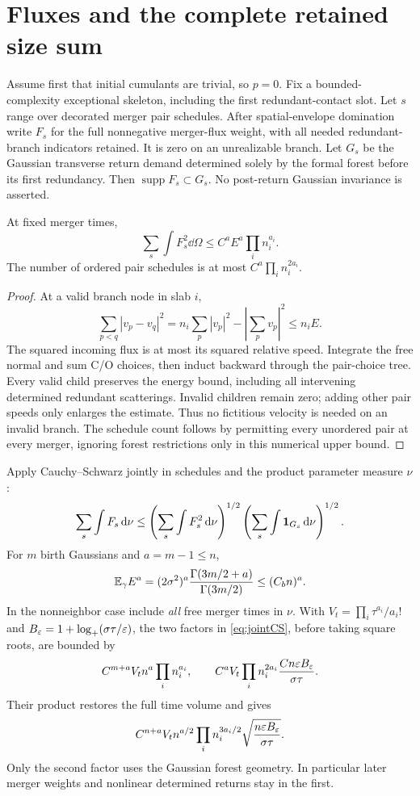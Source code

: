 \section{Fluxes and the complete retained size sum}\label{sec:summation}
Assume first that initial cumulants are trivial, so $p=0$.
Fix a bounded-complexity exceptional skeleton, including the first
redundant-contact slot. Let $s$ range over decorated merger pair schedules.
After spatial-envelope domination write $F_s$ for the full nonnegative
merger-flux weight, with all needed redundant-branch indicators retained.
It is zero on an unrealizable branch. Let $G_s$ be the Gaussian transverse
return demand determined solely by the formal forest before its first
redundancy. Then $\operatorname{supp}F_s\subset G_s$.
No post-return Gaussian invariance is asserted.

\begin{lemma}\label{lem:squared}
At fixed merger times,
\[
 \sum_s\int F_s^2\dd\Omega
       \leq C^aE^a\prod_i n_i^{a_i}.
\]
The number of ordered pair schedules is at most
$C^a\prod_i n_i^{2a_i}$.
\end{lemma}
\begin{proof}
At a valid branch node in slab $i$,
\[
 \sum_{p<q}|v_p-v_q|^2
 =n_i\sum_p|v_p|^2-\left|\sum_pv_p\right|^2\leq n_iE.
\]
The squared incoming flux is at most its squared relative speed.
Integrate the free normal and sum C/O choices, then induct backward
through the pair-choice tree. Every valid child preserves the energy
bound, including all intervening determined redundant scatterings.
Invalid children remain zero; adding other pair speeds only enlarges
the estimate. Thus no fictitious velocity is needed on an invalid branch.
The schedule count follows by permitting every unordered pair at every
merger, ignoring forest restrictions only in this numerical upper bound.
\end{proof}

Apply Cauchy--Schwarz jointly in schedules and the product parameter
measure $\nu$:
\begin{equation}\label{eq:jointCS}
 \sum_s\int F_s\,\mathrm d\nu
 \leq\left(\sum_s\int F_s^2\,\mathrm d\nu\right)^{1/2}
       \left(\sum_s\int\mathbf1_{G_s}\,\mathrm d\nu\right)^{1/2}.
\end{equation}
For $m$ birth Gaussians and $a=m-1\leq n$,
\[
 \mathbb E_\gamma E^a=(2\sigma^2)^a
       \frac{\Gamma(3m/2+a)}{\Gamma(3m/2)}
       \leq(C_bn)^a .
\]
In the nonneighbor case include \emph{all} free merger times in $\nu$.
With $V_t=\prod_i\tau^{a_i}/a_i!$ and
$B_\varepsilon=1+\log_+(\sigma\tau/\varepsilon)$, the two factors in \eqref{eq:jointCS},
before taking square roots, are bounded by
\[
 C^{m+a}V_t n^a\prod_i n_i^{a_i},
 \qquad
 C^aV_t\prod_i n_i^{2a_i}\frac{Cn\varepsilon B_\varepsilon}{\sigma\tau}.
\]
Their product restores the full time volume and gives
\begin{equation}\label{eq:preStirling}
 C^{n+a}V_t n^{a/2}\prod_i n_i^{3a_i/2}
              \sqrt{\frac{n\varepsilon B_\varepsilon}{\sigma\tau}} .
\end{equation}
Only the second factor uses the Gaussian forest geometry. In particular
later merger weights and nonlinear determined returns stay in the first.

